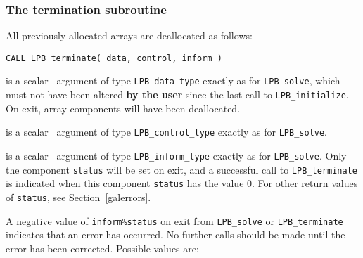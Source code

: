 \documentclass{galahad}
\newcommand{\packagename}{LPB}
\begin{document}

\subsubsection{The  termination subroutine}
All previously allocated arrays are deallocated as follows:
\vspace*{1mm}

\hspace{8mm}
{\tt CALL \packagename\_terminate( data, control, inform )}

\vspace*{-3mm}
\begin{description}

 is a scalar \intentinout\ argument of type
{\tt \packagename\_data\_type}
exactly as for
{\tt \packagename\_solve},
which must not have been altered {\bf by the user} since the last call to
{\tt \packagename\_initialize}.
On exit, array components will have been deallocated.

 is a scalar \intentin\ argument of type
{\tt \packagename\_control\_type}
exactly as for
{\tt \packagename\_solve}.

 is a scalar \intentout\ argument of type
{\tt \packagename\_inform\_type}
exactly as for
{\tt \packagename\_solve}.
Only the component {\tt status} will be set on exit, and a
successful call to
{\tt \packagename\_terminate}
is indicated when this  component {\tt status} has the value 0.
For other return values of {\tt status}, see Section~\ref{galerrors}.

\end{description}



\galerrors
A negative value of {\tt inform\%status} on exit from
{\tt \packagename\_solve}
or
{\tt \packagename\_terminate}
indicates that an error has occurred. No further calls should be made
until the error has been corrected. Possible values are:
\end{document}
